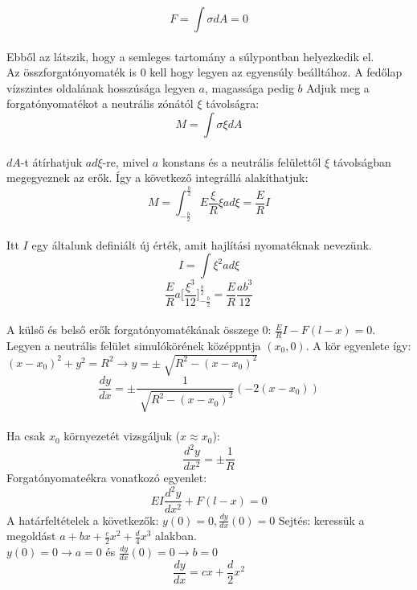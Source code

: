 \documentclass[a4paper]{article}
\begin{document}
\begin{equation}
F=\int\sigma dA=0
\end{equation}
\\
Ebből az látszik, hogy a semleges tartomány a súlypontban helyezkedik el.
\\
Az összforgatónyomaték is 0 kell hogy legyen az egyensúly beálltához. A fedőlap vízszintes oldalának hosszúsága legyen $a$, magassága pedig $b$ Adjuk meg a forgatónyomatékot a neutrális zónától $\xi$ távolságra:
\begin{equation}
M=\int\sigma\xi dA
\end{equation}
\\
$dA$-t átírhatjuk $ad\xi$-re, mivel $a$ konstans és a neutrális felülettől $\xi$ távolságban megegyeznek az erők. Így  a következő integrállá alakíthatjuk:
\begin{equation}
M=\int_{-\frac{b}{2}}^{\frac{b}{2}}E\frac{\xi}{R}\xi ad\xi=\frac{E}{R} I
\end{equation}
\\
Itt $I$ egy általunk definiált új érték, amit hajlítási nyomatéknak nevezünk.
\begin{equation}
I=\int\xi^2ad\xi
\end{equation}
\begin{equation}
\frac{E}{R}a\bigg[\frac{\xi^3}{12}\bigg]_{-\frac{b}{2}}^{\frac{b}{2}}=\frac{E}{R}\frac{ab^3}{12}
\end{equation}
\\
A külső és belső erők forgatónyomatékának összege 0: $\frac{E}{R}I-F(l-x)=0$. Legyen a neutrális felület simulókörének középpntja $(x_0,0)$. A kör egyenlete így: $(x-x_0)^2+y^2=R^2\rightarrow y=\pm\sqrt[]{R^2-(x-x_0)^2}$
\begin{equation}
\frac{dy}{dx}=\pm\frac{1}{\sqrt[]{R^2-(x-x_0)^2}}(-2(x-x_0))
\end{equation}
\\
Ha csak $x_0$ környezetét vizsgáljuk ($x\approx x_0$):
\begin{equation}
\frac{d^2y}{dx^2}=\pm\frac{1}{R}
\end{equation}
Forgatónyomateékra vonatkozó egyenlet:
\begin{equation}
EI\frac{d^2y}{dx^2}+F(l-x)=0
\end{equation}
A határfeltételek a következők: $y(0)=0, \frac{dy}{dx}(0)=0$
Sejtés: keressük a megoldást $a+bx+\frac{c}{2}x^2+\frac{d}{4}x^3$ alakban.
\\
$y(0)=0\rightarrow a=0$ és $\frac{dy}{dx}(0)=0\rightarrow b=0$
\begin{equation}
\frac{dy}{dx}=cx+\frac{d}{2}x^2
\end{equation}
\end{document}
